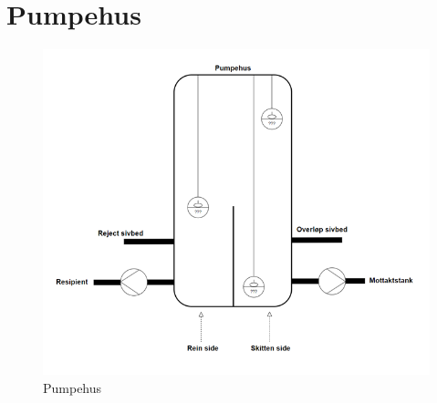 \newpage
\section{Pumpehus}

\begin{figure}[htbp]
    \centering
    \includegraphics[width=1\textwidth]{Figurar/Pumpehus.png}
    \caption{Pumpehus}\label{fig:Pumpehus}
\end{figure}

